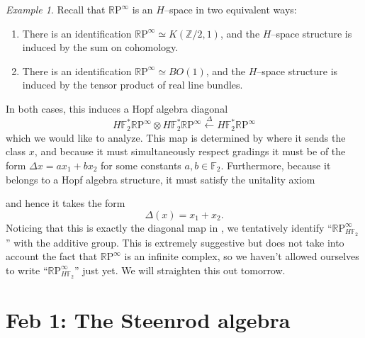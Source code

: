 \documentclass{article}
\newcommand{\Z}{\mathbb Z}
\newcommand{\F}{\mathbb F}
\newcommand{\R}{\mathbb R}
\newcommand{\RP}{\R\mathrm P}
\newcommand{\<}{\langle}
\renewcommand{\>}{\rangle}
\renewcommand{\epsilon}{\varepsilon}
\newcommand{\id}{\mathrm{id}}
\numberwithin{equation}{section}
\theoremstyle{plain}
\theoremstyle{definition}
\theoremstyle{remark}
\newtheorem{example}[equation]{Example}
\begin{document}
\begin{example}\label{RPExampleFaulty}
Recall that $\RP^\infty$ is an $H$--space in two equivalent ways:
\begin{enumerate}
\item There is an identification $\RP^\infty \simeq K(\Z/2, 1)$, and the $H$--space structure is induced by the sum on cohomology.
\item There is an identification $\RP^\infty \simeq BO(1)$, and the $H$--space structure is induced by the tensor product of real line bundles.
\end{enumerate}
In both cases, this induces a Hopf algebra diagonal \[H\F_2^* \RP^\infty \otimes H\F_2^* \RP^\infty \xleftarrow\Delta H\F_2^* \RP^\infty\] which we would like to analyze.  This map is determined by where it sends the class $x$, and because it must simultaneously respect gradings it must be of the form $\Delta x = ax_1 + bx_2$ for some constants $a, b \in \F_2$.  Furthermore, because it belongs to a Hopf algebra structure, it must satisfy the unitality axiom
\begin{center}
\end{center}
and hence it takes the form \[\Delta(x) = x_1 + x_2.\]  Noticing that this is exactly the diagonal map in , we tentatively identify ``$\RP^\infty_{H\F_2}$'' with the additive group.  This is extremely suggestive but does not take into account the fact that $\RP^\infty$ is an infinite complex, so we haven't allowed ourselves to write ``$\RP^\infty_{H\F_2}$'' just yet.  We will straighten this out tomorrow.
\end{example}








\section{Feb 1: The Steenrod algebra}
\end{document}
